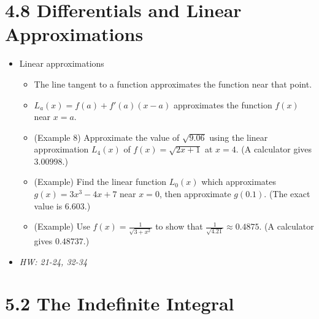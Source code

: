 \documentclass[11pt]{article}
\begin{document}
\section*{4.8 Differentials and Linear Approximations}

\begin{itemize}
\item Linear approximations
  \begin{itemize}
    \item The line tangent to a function approximates the function near that
          point.
    \item \(L_a(x)=f(a)+f'(a)(x-a)\) approximates the function \(f(x)\) near \(x=a\).
    \item (Example 8) Approximate the value of \(\sqrt{9.06}\) using the
          linear approximation \(L_4(x)\) of \(f(x)=\sqrt{2x+1}\) at \(x=4\).
          (A calculator gives \(3.00998\).)
    \item (Example) Find the linear function \(L_0(x)\) which approximates
          \(g(x)=3x^3-4x+7\) near \(x=0\), then approximate \(g(0.1)\).
          (The exact value is \(6.603\).)
    \item (Example) Use \(f(x)=\frac{1}{\sqrt{3+x^2}}\) to show
          that \(\frac{1}{\sqrt{4.21}}\approx 0.4875\).
          (A calculator gives \(0.48737\).)
  \end{itemize}
\item\textit{
  HW: 21-24, 32-34
}
\end{itemize}

\section*{5.2 The Indefinite Integral}
\end{document}
